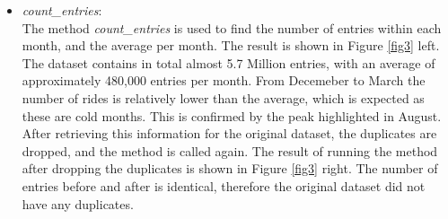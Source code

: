 \documentclass[12pt]{article}
\begin{document}
\begin{itemize}
	\item \textit{count\_entries}:\\
	The method \textit{count\_entries} is used to find the number of entries within each month, and the average per month. The result is shown in Figure \ref{fig3} left. The dataset contains in total almost 5.7 Million entries, with an average of approximately 480,000 entries per month. From Decemeber to March the number of rides is relatively lower than the average, which is expected as these are cold months. This is confirmed by the peak highlighted in August. After retrieving this information for the original dataset, the duplicates are dropped, and the method is called again. The result of running the method after dropping the duplicates is shown in Figure \ref{fig3} right. The number of entries before and after is identical, therefore the original dataset did not have any duplicates.\\ 
	

\end{itemize}
\end{document}
